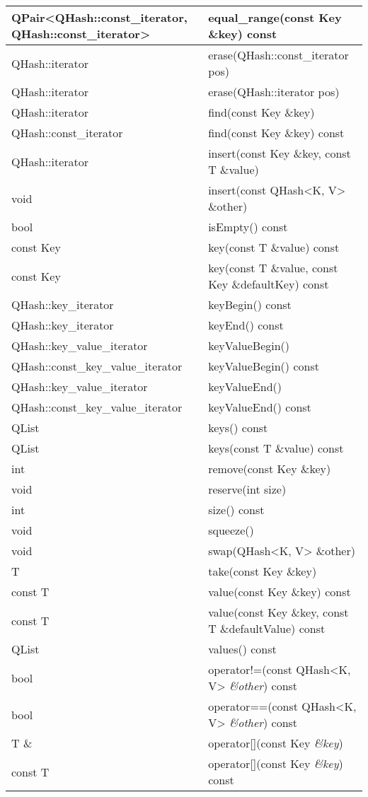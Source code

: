 \begin{longtable}[l]{|l|l|}
\hline
QPair<QHash::const\_iterator, QHash::const\_iterator> &
                                                        equal\_range(const
                                                        Key \&key)
                                                        const\\
\hline
QHash::iterator &	erase(QHash::const\_iterator pos)\\
\hline
QHash::iterator &	erase(QHash::iterator pos)\\
\hline
QHash::iterator &	find(const Key \&key)\\
\hline
QHash::const\_iterator& 	find(const Key \&key) const\\
\hline
QHash::iterator 	&insert(const Key \&key, const T \&value)\\
\hline
void& 	insert(const QHash<K, V> \&other)\\
\hline
bool &	isEmpty() const\\
\hline
const Key& 	key(const T \&value) const\\
\hline
const Key &	key(const T \&value, const Key \&defaultKey) const\\
\hline
QHash::key\_iterator &	keyBegin() const\\
\hline
QHash::key\_iterator &	keyEnd() const\\
\hline
QHash::key\_value\_iterator 	&keyValueBegin()\\
\hline
QHash::const\_key\_value\_iterator& 	keyValueBegin() const\\
\hline
QHash::key\_value\_iterator 	&keyValueEnd()\\
\hline
QHash::const\_key\_value\_iterator &	keyValueEnd() const\\
\hline
QList& 	keys() const\\
\hline
QList& 	keys(const T \&value) const\\
\hline
int &	remove(const Key \&key)\\
\hline
void &	reserve(int size)\\
\hline
int &	size() const\\
\hline
void &	squeeze()\\
\hline
void &	swap(QHash<K, V> \&other)\\
\hline
T 	&take(const Key \&key)\\
\hline
const T &	value(const Key \&key) const\\
\hline
const T &	value(const Key \&key, const T \&defaultValue) const\\
\hline
QList 	&values() const\\
\hline
bool 	&operator!=(const QHash<K, V> \emph{\&other}) const\\
\hline
bool 	&operator==(const QHash<K, V> \emph{\&other}) const\\
\hline
T \& 	&operator[](const Key \emph{\&key})\\
\hline
const T& 	operator[](const Key \emph{\&key}) const\\
\hline
\end{longtable}

